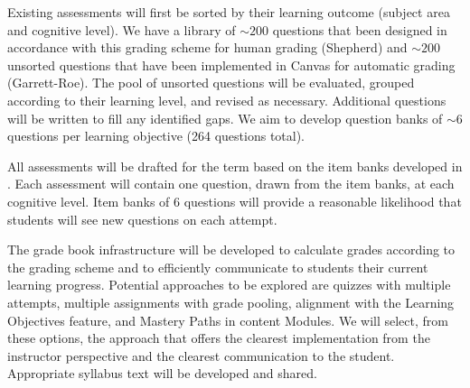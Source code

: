 \documentclass[10pt,letterpaper]{article}
\begin{document}
%
%


\label{ssa:question_bank} Existing assessments will first be sorted by their learning outcome (subject area and cognitive level). We have a library of $\sim200$ questions that been designed in accordance with this grading scheme for human grading (Shepherd) and $\sim200$ unsorted questions that have been implemented in Canvas for automatic grading (Garrett-Roe). The pool of unsorted questions will be evaluated, grouped according to their learning level, and revised as necessary. Additional questions will be written to fill any identified gaps. We aim to develop question banks of $\sim6$ questions per learning objective (264 questions total). 



All assessments will be drafted for the term based on the item banks developed in . Each assessment will contain one question, drawn from the item banks, at each cognitive level. Item banks of 6 questions will provide a reasonable likelihood that students will see new questions on each attempt.

The grade book infrastructure will be developed to calculate grades according to the grading scheme and to efficiently communicate to students their current learning progress. Potential approaches to be explored are quizzes with multiple attempts, multiple assignments with grade pooling, alignment with the Learning Objectives feature, and Mastery Paths in content Modules. We will select, from these options, the approach that offers the clearest implementation from the instructor perspective and the clearest communication to the student. Appropriate syllabus text will be developed and shared.
 
\end{document}
